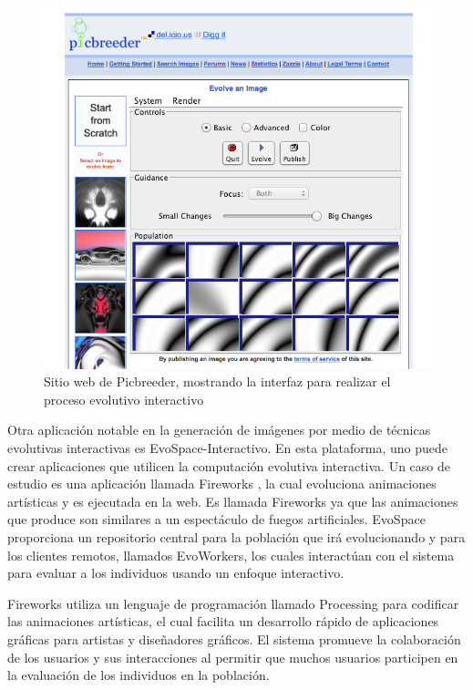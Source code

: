 \begin{figure}[htp]
  \centerline{\includegraphics[width=16.09cm]{picbreeder.png}} \caption{
    Sitio web de Picbreeder, mostrando la interfaz para realizar el proceso evolutivo interactivo
} \label{Picbreeder}
\end{figure}

Otra aplicación notable en la generación de imágenes por medio de
técnicas evolutivas interactivas es EvoSpace-Interactivo. En esta
plataforma, uno puede crear aplicaciones que utilicen la computación
evolutiva interactiva. Un caso de estudio es una aplicación llamada
Fireworks \cite{trujillo2013fireworks}, la cual evoluciona animaciones artísticas y es ejecutada en
la web. Es llamada Fireworks ya que las animaciones que produce son
similares a un espectáculo de fuegos artificiales. EvoSpace
proporciona un repositorio central para la población que irá
evolucionando y para los clientes remotos, llamados EvoWorkers, los
cuales interactúan con el sistema para evaluar a los individuos usando
un enfoque interactivo.

Fireworks utiliza un lenguaje de programación llamado Processing para
codificar las animaciones artísticas, el cual facilita un desarrollo
rápido de aplicaciones gráficas para artistas y diseñadores
gráficos. El sistema promueve la colaboración de los usuarios y sus
interacciones al permitir que muchos usuarios participen en la
evaluación de los individuos en la población.

